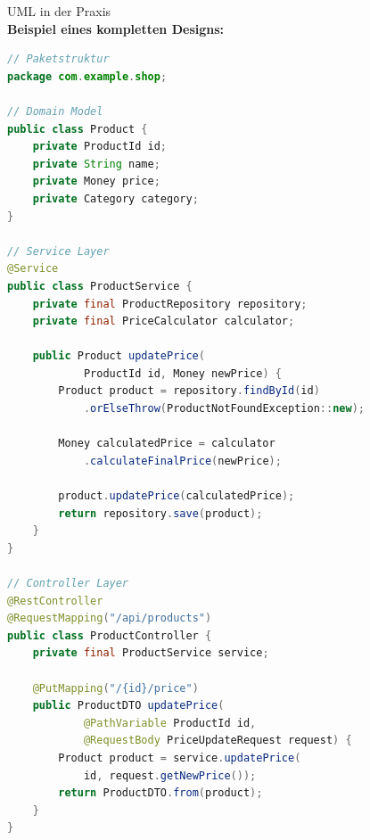 \begin{example2}{UML in der Praxis}\\
\textbf{Beispiel eines kompletten Designs:}

\begin{lstlisting}[language=Java, style=basesmol]
// Paketstruktur
package com.example.shop;

// Domain Model
public class Product {
    private ProductId id;
    private String name;
    private Money price;
    private Category category;
}

// Service Layer
@Service
public class ProductService {
    private final ProductRepository repository;
    private final PriceCalculator calculator;
    
    public Product updatePrice(
            ProductId id, Money newPrice) {
        Product product = repository.findById(id)
            .orElseThrow(ProductNotFoundException::new);
            
        Money calculatedPrice = calculator
            .calculateFinalPrice(newPrice);
            
        product.updatePrice(calculatedPrice);
        return repository.save(product);
    }
}

// Controller Layer
@RestController
@RequestMapping("/api/products")
public class ProductController {
    private final ProductService service;
    
    @PutMapping("/{id}/price")
    public ProductDTO updatePrice(
            @PathVariable ProductId id,
            @RequestBody PriceUpdateRequest request) {
        Product product = service.updatePrice(
            id, request.getNewPrice());
        return ProductDTO.from(product);
    }
}
\end{lstlisting}
\end{example2}

